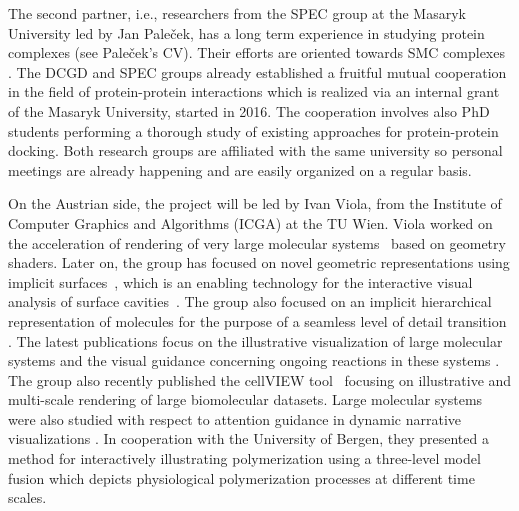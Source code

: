 \documentclass[11pt,a4paper,titlepage,oneside,onecolumn]{article}
\begin{document}
The second partner, i.e., researchers from the SPEC group at the Masaryk University led by Jan Pale\v{c}ek, has a long term experience in studying protein complexes (see Pale\v{c}ek's CV). 
Their efforts are oriented towards SMC complexes \cite{guerineau,hudson,Palecek2015}.
The DCGD and SPEC groups already established a fruitful mutual cooperation in the field of protein-protein interactions which is realized via an internal grant of the Masaryk University, started in 2016.
The cooperation involves also PhD students performing a thorough study of existing approaches for protein-protein docking.
Both research groups are affiliated with the same university so personal meetings are already happening and are easily organized on a regular basis.
 
On the Austrian side, the project will be led by Ivan Viola, from the Institute of Computer Graphics and Algorithms (ICGA) at the TU Wien. 
Viola worked on the acceleration of rendering of very large molecular systems~\cite{lampe} based on geometry shaders. 
Later on, the group has focused on novel geometric representations using implicit surfaces~\cite{ParulekViola2012}, which is an enabling technology for the interactive visual analysis of surface cavities~\cite{parulek2012implicit,parulek13visualanalysis}. 
The group also focused on an implicit hierarchical representation of molecules for the purpose of a seamless level of detail transition \cite{parulek13seamless}.
The latest publications focus on the illustrative visualization of large molecular systems and the visual guidance concerning ongoing reactions in these systems \cite{Muzic2014}.
The group also recently published the cellVIEW tool~\cite{cellview} focusing on illustrative and multi-scale rendering  of large biomolecular datasets. 
Large molecular systems were also studied with respect to attention guidance in dynamic narrative visualizations \cite{waldner}. 
In cooperation with the University of Bergen, they presented a method for interactively illustrating polymerization using a three-level model fusion \cite{kolesar} which depicts physiological polymerization processes at different time scales.
 
\end{document}
